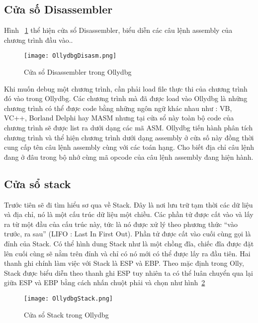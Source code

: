 	\subsection*{Cửa số Disassembler}
	Hình ~\ref{fig:OllydbgDisasm} thể hiện cửa sổ Disassembler, biểu diễn các câu lệnh assembly của chương trình đầu vào.. 
		\begin{center}
			\begin{figure}[htp]
				\begin{center}
					\texttt{[image: OllydbgDisasm.png]}
				\end{center}
				\caption{Cửa sổ Disassembler trong Ollydbg}	
					\label{fig:OllydbgDisasm}		
			\end{figure}
		\end{center}		
		
		Khi muốn debug một chương trình, cần phải load file thực thi của chương trình đó vào trong Ollydbg. Các chương trình mà đã được load vào Ollydbg là những chương trình có thể được code bằng những ngôn ngữ khác nhau như : VB, VC++, Borland Delphi hay MASM nhưng tại cửa sổ này toàn bộ code của chương trình sẽ được list ra dưới dạng các mã ASM. Ollydbg tiến hành phân tích chương trình và thể hiện chương trình dưới dạng assembly ở cửa số này đồng thời cung cấp tên câu lệnh assembly cùng với các toán hạng. Cho biết địa chỉ câu lệnh đang ở đâu trong bộ nhớ cùng mã opcode của câu lệnh assembly đang hiện hành. 
	
		\newpage
		\subsection*{Cửa sổ stack}
		Trước tiên sẽ đi tìm hiểu sơ qua về Stack. Đây là nơi lưu trữ tạm thời các dữ liệu và địa chỉ, nó là một cấu trúc dữ liệu một chiều. Các phần tử được cất vào và lấy ra từ một đầu của cấu trúc này, tức là nó được xử lý theo phương thức “vào trước, ra sau” (LIFO : Last In First Out). Phần tử được cất vào cuối cùng gọi là đỉnh của Stack. Có thể hình dung Stack như là một chồng đĩa, chiếc đĩa được đặt lên cuối cùng sẽ nằm trên đỉnh và chỉ có nó mới có thể được lấy ra đầu tiên. Hai thanh ghi chính làm việc với Stack là ESP và EBP. Theo mặc định trong Olly, Stack được biểu diễn theo thanh ghi ESP tuy nhiên ta có thể luân chuyển qua lại giữa ESP và EBP bằng cách nhấn chuột phải và chọn như hình~\ref{fig:OllydbgStack}
		\begin{center}
			\begin{figure}[htp]
				\begin{center}
					\texttt{[image: OllydbgStack.png]}
				\end{center}
				\caption{Cửa sổ Stack trong Ollydbg}	
					\label{fig:OllydbgStack}		
			\end{figure}
		\end{center}				
	
